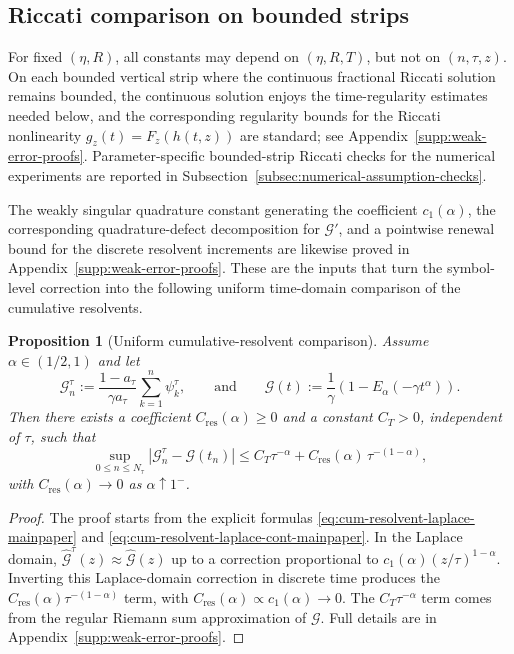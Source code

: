 \documentclass[letterpaper]{article}
\numberwithin{equation}{section}
\newtheorem{proposition}[theorem]{Proposition}
\theoremstyle{definition}
\theoremstyle{remark}
\begin{document}

\subsection{Riccati comparison on bounded strips}
\label{subsec:transform-bound}

For fixed $(\eta,R)$, all constants may depend on $(\eta,R,T)$, but not on $(n,\tau,z)$. On each bounded vertical strip where the continuous fractional Riccati solution remains bounded, the continuous solution enjoys the time-regularity estimates needed below, and the corresponding regularity bounds for the Riccati nonlinearity $g_z(t)=F_z(h(t,z))$ are standard; see Appendix~\ref{supp:weak-error-proofs}. Parameter-specific bounded-strip Riccati checks for the numerical experiments are reported in Subsection~\ref{subsec:numerical-assumption-checks}.

The weakly singular quadrature constant generating the coefficient $c_1(\alpha)$, the corresponding quadrature-defect decomposition for $\mathcal G'$, and a pointwise renewal bound for the discrete resolvent increments are likewise proved in Appendix~\ref{supp:weak-error-proofs}. These are the inputs that turn the symbol-level correction into the following uniform time-domain comparison of the cumulative resolvents.

\begin{proposition}[Uniform cumulative-resolvent comparison]
\label{prop:cum-resolvent-uniform-comparison}
Assume $\alpha\in(1/2,1)$ and let
\[
  \mathcal G_n^\tau
  :=
  \frac{1-a_\tau}{\gamma a_\tau}\sum_{k=1}^n\psi_k^\tau,
\qquad
\text{and}
\qquad
  \mathcal G(t)
  :=
  \frac1\gamma\left(1-E_\alpha(-\gamma t^\alpha)\right).
\]
Then there exists a coefficient $C_{\mathrm{res}}(\alpha)\ge0$ and a constant $C_T>0$, independent of $\tau$, such that
\begin{equation}\label{eq:cum-resolvent-uniform-comparison}
  \sup_{0\le n\le N_\tau}
  |\mathcal G_n^\tau-\mathcal G(t_n)|
  \le
  C_T\tau^{-\alpha}+C_{\mathrm{res}}(\alpha)\,\tau^{-(1-\alpha)},
\end{equation}
with $C_{\mathrm{res}}(\alpha)\to0$ as $\alpha\uparrow1^-$. 
\end{proposition}

\begin{proof}
{The proof starts from the explicit formulas
\eqref{eq:cum-resolvent-laplace-mainpaper} and
\eqref{eq:cum-resolvent-laplace-cont-mainpaper}. In the Laplace domain,
$\widehat{\mathcal{G}}^\tau(z)\approx\widehat{\mathcal{G}}(z)$ up to a
correction proportional to $c_1(\alpha)(z/\tau)^{1-\alpha}$. Inverting this
Laplace-domain correction in discrete time produces the
$C_{\mathrm{res}}(\alpha)\tau^{-(1-\alpha)}$ term, with
$C_{\mathrm{res}}(\alpha)\propto c_1(\alpha)\to0$. The $C_T\tau^{-\alpha}$ term
comes from the regular Riemann sum approximation of $\mathcal{G}$.} Full
details are in Appendix~\ref{supp:weak-error-proofs}.
\end{proof}
\end{document}
